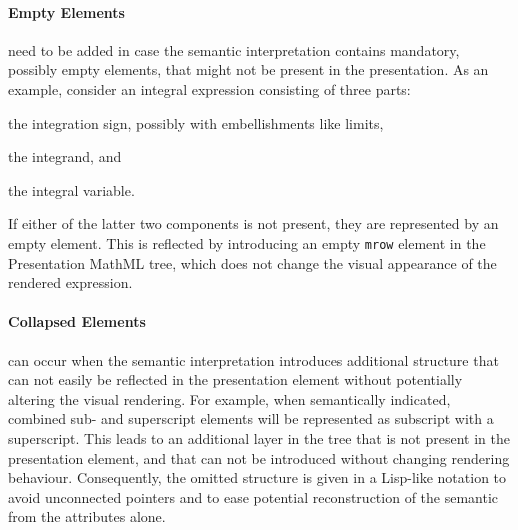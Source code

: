 \documentclass{llncs}
\begin{document}
\paragraph{Empty Elements} need to be added in case the semantic interpretation
contains mandatory, possibly empty elements, that might not be present in the
presentation. As an example, consider an integral expression consisting of three
parts:
\begin{inparaenum}[(1)]
\item the integration sign, possibly with embellishments like limits,
\item the integrand, and
\item the integral variable.
\end{inparaenum}
If either of the latter two components is not present, they are represented by
an empty element. This is reflected by introducing an empty \texttt{mrow} element in the
Presentation MathML tree, which does not change the visual appearance of the
rendered expression.


\paragraph{Collapsed Elements} can occur when the semantic interpretation
introduces additional structure that can not easily be reflected in the
presentation element without potentially altering the visual rendering. For
example, when semantically indicated, combined sub- and superscript elements
will be represented as subscript with a superscript. This leads to an additional
layer in the tree that is not present in the presentation element, and that can
not be introduced without changing rendering behaviour.  Consequently, the
omitted structure is given in a Lisp-like notation to avoid unconnected pointers
and to ease potential reconstruction of the semantic from the attributes alone.
\end{document}
